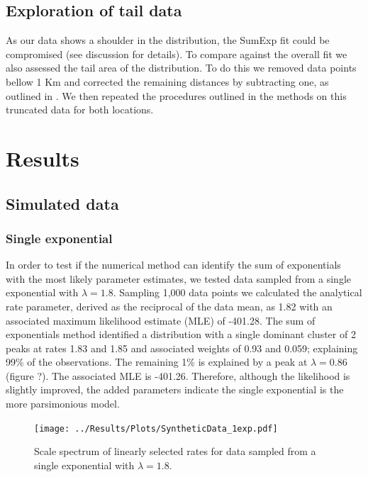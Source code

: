 \documentclass[11pt,usenames,dvipsnames]{article}
\begin{document}
\subsection{Exploration of tail data}

\begin{linenumbers}
\hspace{\parindent}
As our data shows a shoulder in the distribution, the SumExp fit could be compromised (see discussion for details). To compare against the overall fit we also assessed the tail area of the distribution. To do this we removed data points bellow 1 Km and corrected the remaining distances by subtracting one, as outlined in \cite{Petrovskii2011}. We then repeated the procedures outlined in the methods on this truncated data for both locations.
\end{linenumbers}
\section{Results}

\noindent
\subsection{Simulated data}

\subsubsection{Single exponential}

\begin{linenumbers}
\hspace{\parindent}
In order to test if the numerical method can identify the sum of exponentials with the most likely parameter estimates, we tested data sampled from a single exponential with $\lambda = 1.8$. Sampling 1,000 data points we calculated the analytical rate parameter, derived as the reciprocal of the data mean, as 1.82 with an associated maximum likelihood estimate (MLE) of -401.28. The sum of exponentials method identified a distribution with a single dominant cluster of 2 peaks at rates 1.83 and 1.85 and associated weights of 0.93 and 0.059; explaining 99\% of the observations. The remaining 1\% is explained by a peak at $\lambda = 0.86$ (figure ?). The associated MLE is -401.26. Therefore, although the likelihood is slightly improved, the added parameters indicate the single exponential is the more parsimonious model.
\end{linenumbers}
\begin{figure}[H]
	\centering
	\texttt{[image: ../Results/Plots/SyntheticData\_1exp.pdf]}
	\caption{Scale spectrum of linearly selected rates for data sampled from a single exponential with $\lambda = 1.8$.}
\end{figure}
\end{document}
